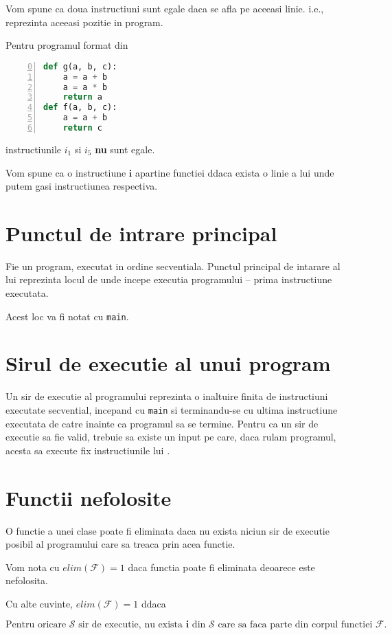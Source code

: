 Vom spune ca doua instructiuni sunt egale daca se afla pe aceeasi
linie. i.e., reprezinta aceeasi pozitie in program.

Pentru programul format din
\begin{lstlisting}[language=Python, numbers=left, firstnumber=0]
def g(a, b, c):
    a = a + b
    a = a * b
    return a
def f(a, b, c):
    a = a + b
    return c
\end{lstlisting}
instructiunile $i_1$ si $i_5$ \textbf{nu} sunt egale.

Vom spune ca o instructiune $\mathbf{i}$ apartine functiei
 ddaca exista o linie a lui  unde putem gasi
instructiunea respectiva.

\section{Punctul de intrare principal}

Fie  un program, executat in ordine secventiala.
Punctul principal de intarare al lui  reprezinta locul de
unde incepe executia programului -- prima instructiune executata.

Acest loc va fi notat cu \texttt{main}.

\section{Sirul de executie al unui program}

Un sir de executie  al programului  reprezinta o inaltuire
finita de instructiuni executate secvential, incepand cu
\texttt{main} si terminandu-se cu ultima instructiune executata de
catre  inainte ca programul sa se termine.
Pentru ca un sir de executie  sa fie valid, trebuie sa
existe un input pe care, daca rulam programul, acesta sa
execute fix instructiunile lui .

\section{Functii nefolosite}

O functie a unei clase poate fi eliminata daca nu exista niciun
sir de executie posibil al programului care sa treaca prin acea
functie.

Vom nota cu $elim(\mathcal{F}) = 1$ daca functia  poate fi
eliminata deoarece este nefolosita.

Cu alte cuvinte, $elim(\mathcal{F}) = 1$ ddaca

\[
\text{Pentru oricare } \mathcal{S} \text{ sir de executie, nu
exista } \mathbf{i} \text{ din } \mathcal{S} \text { care sa faca
parte din corpul functiei } \mathcal{F}.
\]

